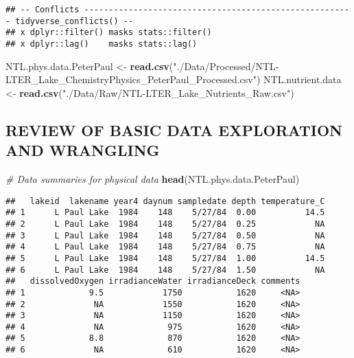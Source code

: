 \documentclass[]{article}
\newenvironment{Shaded}{\begin{snugshade}}{\end{snugshade}}
\newcommand{\KeywordTok}[1]{\textcolor[rgb]{0.13,0.29,0.53}{\textbf{#1}}}
\newcommand{\StringTok}[1]{\textcolor[rgb]{0.31,0.60,0.02}{#1}}
\newcommand{\CommentTok}[1]{\textcolor[rgb]{0.56,0.35,0.01}{\textit{#1}}}
\newcommand{\NormalTok}[1]{#1}
\begin{document}
\begin{verbatim}
## -- Conflicts ------------------------------------------------------- tidyverse_conflicts() --
## x dplyr::filter() masks stats::filter()
## x dplyr::lag()    masks stats::lag()
\end{verbatim}

\begin{Shaded}
\begin{Highlighting}[]
\NormalTok{NTL.phys.data.PeterPaul <-}\StringTok{ }\KeywordTok{read.csv}\NormalTok{(}\StringTok{"./Data/Processed/NTL-LTER_Lake_ChemistryPhysics_PeterPaul_Processed.csv"}\NormalTok{)}
\NormalTok{NTL.nutrient.data <-}\StringTok{ }\KeywordTok{read.csv}\NormalTok{(}\StringTok{"./Data/Raw/NTL-LTER_Lake_Nutrients_Raw.csv"}\NormalTok{)}
\end{Highlighting}
\end{Shaded}

\subsection{REVIEW OF BASIC DATA EXPLORATION AND
WRANGLING}\label{review-of-basic-data-exploration-and-wrangling}

\begin{Shaded}
\begin{Highlighting}[]
\CommentTok{# Data summaries for physical data}
\KeywordTok{head}\NormalTok{(NTL.phys.data.PeterPaul)}
\end{Highlighting}
\end{Shaded}

\begin{verbatim}
##   lakeid  lakename year4 daynum sampledate depth temperature_C
## 1      L Paul Lake  1984    148    5/27/84  0.00          14.5
## 2      L Paul Lake  1984    148    5/27/84  0.25            NA
## 3      L Paul Lake  1984    148    5/27/84  0.50            NA
## 4      L Paul Lake  1984    148    5/27/84  0.75            NA
## 5      L Paul Lake  1984    148    5/27/84  1.00          14.5
## 6      L Paul Lake  1984    148    5/27/84  1.50            NA
##   dissolvedOxygen irradianceWater irradianceDeck comments
## 1             9.5            1750           1620     <NA>
## 2              NA            1550           1620     <NA>
## 3              NA            1150           1620     <NA>
## 4              NA             975           1620     <NA>
## 5             8.8             870           1620     <NA>
## 6              NA             610           1620     <NA>
\end{verbatim}
\end{document}
